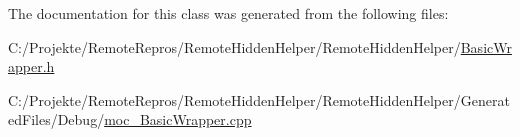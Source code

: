 The documentation for this class was generated from the following files\+:\begin{DoxyCompactItemize}
\item 
C\+:/\+Projekte/\+Remote\+Repros/\+Remote\+Hidden\+Helper/\+Remote\+Hidden\+Helper/\hyperlink{_basic_wrapper_8h}{Basic\+Wrapper.\+h}\item 
C\+:/\+Projekte/\+Remote\+Repros/\+Remote\+Hidden\+Helper/\+Remote\+Hidden\+Helper/\+Generated\+Files/\+Debug/\hyperlink{_debug_2moc___basic_wrapper_8cpp}{moc\+\_\+\+Basic\+Wrapper.\+cpp}\end{DoxyCompactItemize}

